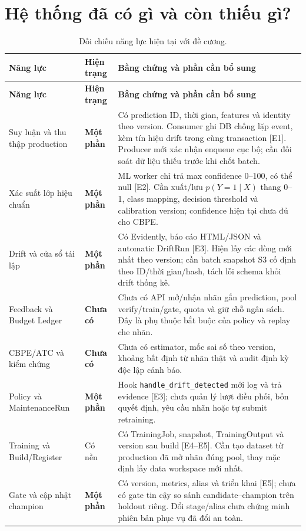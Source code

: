 \documentclass[11pt,a4paper]{article}
\newcommand{\statuspartial}{\textcolor{orange!65!black}{\textbf{Một phần}}}
\newcommand{\missing}{\textcolor{red!60!black}{\textbf{Chưa có}}}
\begin{document}
\section{Hệ thống đã có gì và còn thiếu gì?}
\begin{longtable}{@{}L{3cm} L{1.7cm} L{\dimexpr\linewidth-4.7cm-4\tabcolsep\relax}@{}}
\caption{Đối chiếu năng lực hiện tại với đề cương.}\label{tab:gaps}\\
\toprule\textbf{Năng lực} & \textbf{Hiện trạng} & \textbf{Bằng chứng và phần cần bổ sung}\\
\midrule\endfirsthead
\toprule\textbf{Năng lực} & \textbf{Hiện trạng} & \textbf{Bằng chứng và phần cần bổ sung}\\
\midrule\endhead
Suy luận và thu thập production & \statuspartial & Có prediction ID, thời gian, features và identity theo version. Consumer ghi DB chống lặp event, kèm tín hiệu drift trong cùng transaction [E1]. Producer mới xác nhận enqueue cục bộ; cần đối soát dữ liệu thiếu trước khi chốt batch.\\
Xác suất lớp hiệu chuẩn & \statuspartial & ML worker chỉ trả max confidence 0--100, có thể null [E2]. Cần xuất/lưu $p(Y=1\mid X)$ thang 0--1, class mapping, decision threshold và calibration version; confidence hiện tại chưa đủ cho CBPE.\\
Drift và cửa sổ tái lập & \statuspartial & Có Evidently, báo cáo HTML/JSON và automatic DriftRun [E3]. Hiện lấy các dòng mới nhất theo version; cần batch snapshot S3 cố định theo ID/thời gian/hash, tách lỗi schema khỏi drift thống kê.\\
Feedback và Budget Ledger & \missing & Chưa có API mở/nhận nhãn gắn prediction, pool verify/train/gate, quota và giữ chỗ ngân sách. Đây là phụ thuộc bắt buộc của policy và replay che nhãn.\\
CBPE/ATC và kiểm chứng & \missing & Chưa có estimator, mốc sai số theo version, khoảng bất định từ nhãn thật và audit định kỳ độc lập cảnh báo.\\
Policy và MaintenanceRun & \statuspartial & Hook \texttt{handle\_drift\_detected} mới log và trả evidence [E3]; chưa quản lý lượt điều phối, bốn quyết định, yêu cầu nhãn hoặc tự submit retraining.\\
Training và Build/Register & Có nền & Có TrainingJob, snapshot, TrainingOutput và version sau build [E4--E5]. Cần tạo dataset từ production đã mở nhãn đúng pool, thay mặc định lấy data workspace mới nhất.\\
Gate và cập nhật champion & \statuspartial & Có version, metrics, alias và triển khai [E5]; chưa có gate tin cậy so sánh candidate--champion trên holdout riêng. Đổi stage/alias chưa chứng minh phiên bản phục vụ đã đổi an toàn.\\

\end{longtable}
\end{document}
